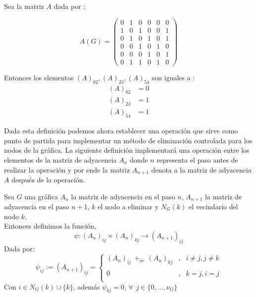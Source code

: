 \begin{example}
Sea la matriz $A$ dada por :
\begin{center}
\begin{equation}
A(G) =
\begin{pmatrix}
0 & 1 & 0 & 0 & 0 & 0\\
1 & 0 & 1 & 0 & 0 & 1\\
0 & 1 & 0 & 1 & 0 & 1\\
0 & 0 & 1 & 0 & 1 & 0\\
0 & 0 & 0 & 1 & 0 & 1\\
0 & 1 & 1 & 0 & 1 & 0
\end{pmatrix}
\end{equation}
    
\end{center}
Entonces los elementos $(A)_{02},(A)_{23},(A)_{54}$ son iguales a :
\begin{align*}
    (A)_{02} &= 0 \\
    (A)_{23} &= 1\\
    (A)_{54} &= 1
\end{align*}

\end{example}

Dada esta definición podemos ahora establecer una operación que sirve como punto de partida para implementar un método de eliminación controlada para los nodos de la gráfica.
La siguiente definición implementará una operación entre los elementos de la matriz de adyacencia $A_n$ donde $n$ representa el paso antes de realizar la operación y por ende la matriz $A_{n+1}$ denota a la matriz de adyacencia $A$ después de la operación.

\begin{definition}
Sea $G$ una gráfica $A_n$ la matriz de adyacencia en el paso $n$, $A_{n+1}$ la matriz de adyacencia en el paso $n+1$, $k$ el nodo a eliminar y $N_G(k)$ el vecindario del nodo $k$.\\
Entonces definimos la función,
\[
\psi : (A_n)_{ij} \times (A_n)_{kj} \rightarrow (A_{n+1})_{ij}
\]
Dada por:
\begin{equation}
    \psi_{ij} := (A_{n+1})_{ij}= \left\{ \begin{array}{lcc} (A_n)_{ij} \hspace{5pt} +_{or} \hspace{5pt} (A_n)_{kj} & , & i \neq j, j \neq k \\ \\0 & , & k = j, i=j \\  \end{array} \right.
\end{equation}
Con $i \in N_G(k) \cup \{k\}$, además $\psi_{kj} = 0$, $\forall \hspace{5pt} j \in \{0,...,\nu_G\}$
    
\end{definition}

